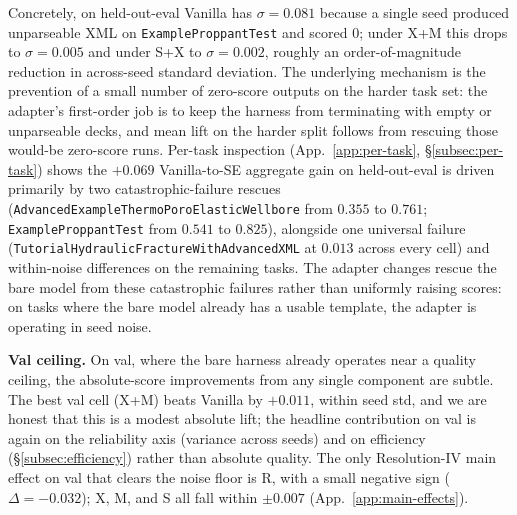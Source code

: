 \documentclass{article}
\begin{document}
Concretely, on held-out-eval Vanilla has $\sigma = 0.081$ because a single seed produced unparseable XML on \texttt{ExampleProppantTest} and scored 0; under X+M this drops to $\sigma = 0.005$ and under S+X to $\sigma = 0.002$, roughly an order-of-magnitude reduction in across-seed standard deviation. The underlying mechanism is the prevention of a small number of zero-score outputs on the harder task set: the adapter's first-order job is to keep the harness from terminating with empty or unparseable decks, and mean lift on the harder split follows from rescuing those would-be zero-score runs. Per-task inspection (App.~\ref{app:per-task}, \S\ref{subsec:per-task}) shows the $+0.069$ Vanilla-to-SE aggregate gain on held-out-eval is driven primarily by two catastrophic-failure rescues (\texttt{AdvancedExampleThermoPoroElasticWellbore} from $0.355$ to $0.761$; \texttt{ExampleProppantTest} from $0.541$ to $0.825$), alongside one universal failure (\texttt{TutorialHydraulicFractureWithAdvancedXML} at $0.013$ across every cell) and within-noise differences on the remaining tasks. The adapter changes rescue the bare model from these catastrophic failures rather than uniformly raising scores: on tasks where the bare model already has a usable template, the adapter is operating in seed noise.

\label{subsec:per-task}\textbf{Val ceiling.} On val, where the bare harness already operates near a quality ceiling, the absolute-score improvements from any single component are subtle. The best val cell (X+M) beats Vanilla by $+0.011$, within seed std, and we are honest that this is a modest absolute lift; the headline contribution on val is again on the reliability axis (variance across seeds) and on efficiency (\S\ref{subsec:efficiency}) rather than absolute quality. The only Resolution-IV main effect on val that clears the noise floor is R, with a small negative sign ($\Delta = -0.032$); X, M, and S all fall within $\pm 0.007$ (App.~\ref{app:main-effects}). 
\end{document}
